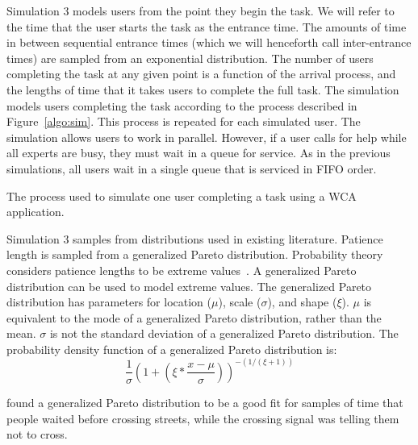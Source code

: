 Simulation 3 models users from the point they begin the task.
We will refer to the time that the user starts the task as the entrance time.
The amounts of time in between sequential entrance times (which we will
henceforth call inter-entrance times) are sampled from an exponential
distribution.
The number of users completing the task at any given point is a function of the
arrival process, and the lengths of time that it takes users to complete the
full task.
The simulation models users completing the task according to the process
described in Figure~\ref{algo:sim}.
This process is repeated for each simulated user.
The simulation allows users to work in parallel.
However, if a user calls for help while all experts are busy, they must wait in
a queue for service.
As in the previous simulations, all users wait in a single queue that is
serviced in FIFO order.

\begin{algorithm}[h]
  \caption{
    The process used to simulate one user completing a task using a WCA
    application.
  }\label{algo:sim}
\end{algorithm}

Simulation 3 samples from distributions used in existing literature.
Patience length is sampled from a generalized Pareto distribution.
Probability theory considers patience lengths to be extreme
values~\cite{patience}.
A generalized Pareto distribution can be used to model extreme values.
The generalized Pareto distribution has parameters for location ($\mu$), scale
($\sigma$), and shape ($\xi$).
$\mu$ is equivalent to the mode of a generalized Pareto distribution, rather than
the mean.
$\sigma$ is not the standard deviation of a generalized Pareto distribution.
The probability density function of a generalized Pareto distribution is:
\[
  \frac{1}{\sigma} \left(1 + \left(\xi * \frac{x - \mu}{\sigma}\right)
  \right)^{-(1/(\xi + 1))}
\]


\citet{patience} found a generalized Pareto distribution to be a good fit for
samples of time that people waited before crossing streets, while the crossing
signal was telling them not to cross.

